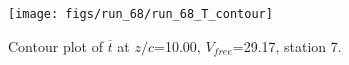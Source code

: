 \begin{figure}[H]
\centering
\texttt{[image: figs/run\_68/run\_68\_T\_contour]}
\caption{Contour plot of $\overline{t}$ at $z/c$=10.00, $V_{free}$=29.17, station 7.}
\end{figure}


